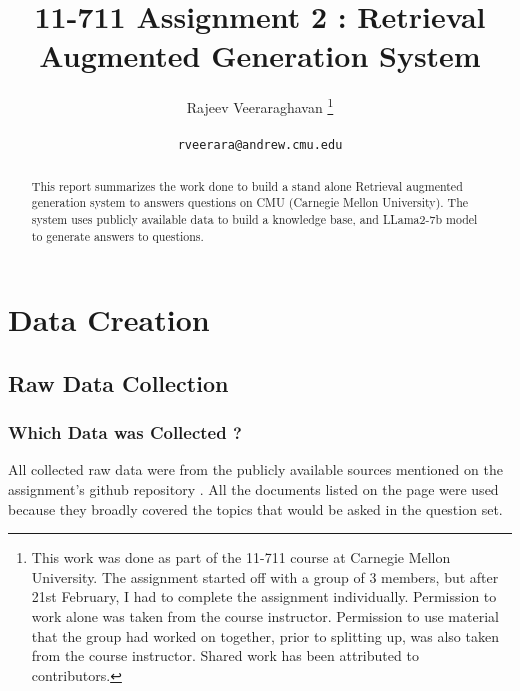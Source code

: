 \documentclass[11pt]{article}
\title{11-711 Assignment 2 : Retrieval Augmented Generation System}
\author{Rajeev Veeraraghavan \thanks{This work was done as part of the 11-711 course at Carnegie Mellon University.
The assignment started off with a group of 3 members, but after 21st February, I had to complete the assignment individually.
Permission to work alone was taken from the course instructor. Permission to use material that the group had worked on together, prior to splitting up, was also taken from the course instructor. Shared work has been attributed to contributors.} \\
\\
  \texttt{rveerara@andrew.cmu.edu}
}
\begin{document}
\maketitle
\begin{abstract}
This report summarizes the work done to build a stand alone Retrieval augmented generation system to answers questions on CMU (Carnegie Mellon University).
The system uses publicly available data to build a knowledge base, and LLama2-7b model to generate answers to questions.
\end{abstract}

\section{Data Creation}

\subsection{Raw Data Collection}
\subsubsection[short]{Which Data was Collected ?}
All collected raw data were from the publicly available sources mentioned on the assignment's github repository \cite{assignment-github}.
All the documents listed on the page were used because they broadly covered the topics that would be asked in the question set.
\end{document}
